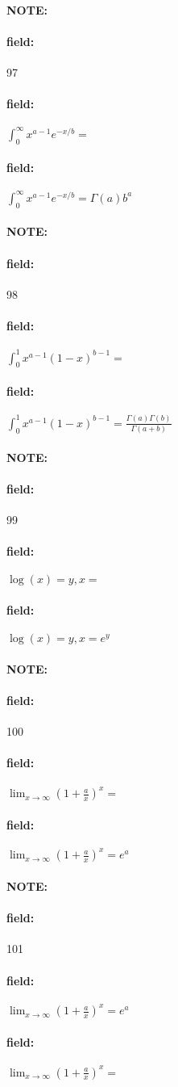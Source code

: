 \documentclass[12pt]{article}
\newenvironment{note}{\paragraph{NOTE:}}{}
\newenvironment{field}{\paragraph{field:}}{}
\begin{document}
\begin{note} \begin{field} \tiny 97 \end{field}
  \begin{field}
    $\int_0^\infty x^{a-1}e^{-x/b} = $
  \end{field}
  \begin{field}
    $\int_0^\infty x^{a-1}e^{-x/b} = \Gamma(a)b^a$
  \end{field}
\end{note}

\begin{note} \begin{field} \tiny 98 \end{field}
  \begin{field}
    $\int_0^1 x^{a - 1}(1 - x)^{b-1} = $
  \end{field}
  \begin{field}
    $\int_0^1 x^{a - 1}(1 - x)^{b-1} = \frac{\Gamma(a)\Gamma(b)}{\Gamma(a + b)}$
  \end{field}
\end{note}

\begin{note} \begin{field} \tiny 99 \end{field}
  \begin{field}
    $\log(x) = y , x = $
  \end{field}
  \begin{field}
    $\log(x) = y , x = e^y$
  \end{field}
\end{note}

\begin{note} \begin{field} \tiny 100 \end{field}
  \begin{field}
    $\lim_{x \to \infty}( 1 + \frac{a}{x})^x = $
  \end{field}
    \begin{field}
      $\lim_{x \to \infty}( 1 + \frac{a}{x})^x = e^a$
    \end{field}
\end{note}

\begin{note} \begin{field} \tiny 101 \end{field}
  \begin{field}
    $\lim_{x \to \infty}( 1 + \frac{a}{x})^x = e^a$
  \end{field}
  \begin{field}
    $\lim_{x \to \infty}( 1 + \frac{a}{x})^x = $
  \end{field}
\end{note}
\end{document}
